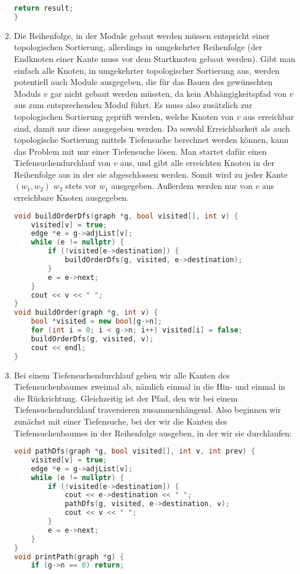 \documentclass[11pt,a4paper]{article}
\begin{document}
\begin{loesung}
\begin{enumerate}
\begin{lstlisting}[language=c++]
    return result;
}
        \end{lstlisting}

        \item
        Die Reihenfolge, in der Module gebaut werden müssen entspricht einer topologischen Sortierung, allerdings in umgekehrter Reihenfolge (der Endknoten einer Kante muss vor dem Startknoten gebaut werden).
        Gibt man einfach alle Knoten, in umgekehrter topologischer Sortierung aus, werden potentiell auch Module ausgegeben, die für das Bauen des gewünschten Moduls $v$ gar nicht gebaut werden müssten, da kein Abhängigkeitspfad von $v$ aus zum entsprechenden Modul führt.
        Es muss also zusätzlich zur topologischen Sortierung geprüft werden, welche Knoten von $v$ aus erreichbar sind, damit nur diese ausgegeben werden.
        Da sowohl Erreichbarkeit als auch topologische Sortierung mittels Tiefensuche berechnet werden können, kann das Problem mit nur einer Tiefensuche lösen.
        Man startet dafür einen Tiefensuchendurchlauf von $v$ aus, und gibt alle erreichten Knoten in der Reihenfolge aus in der sie abgeschlossen werden.
        Somit wird zu jeder Kante $(w_1, w_2)$ $w_2$ stets vor $w_1$ ausgegeben.
        Außerdem werden nur von $v$ aus erreichbare Knoten ausgegeben.
        \begin{lstlisting}[language=c++]
void buildOrderDfs(graph *g, bool visited[], int v) {
    visited[v] = true;
    edge *e = g->adjList[v];
    while (e != nullptr) {
        if (!visited[e->destination]) {
            buildOrderDfs(g, visited, e->destination);
        }
        e = e->next;
    }
    cout << v << " ";
}
void buildOrder(graph *g, int v) {
    bool *visited = new bool[g->n];
    for (int i = 0; i < g->n; i++) visited[i] = false;
    buildOrderDfs(g, visited, v);
    cout << endl;
}
        \end{lstlisting}

        \item
        Bei einem Tiefensuchendurchlauf gehen wir alle Kanten des Tiefensuchenbaumes zweimal ab, nämlich einmal in die Hin- und einmal in die Rückrichtung.
        Gleichzeitig ist der Pfad, den wir bei einem Tiefensuchendurchlauf traversieren zusammenhängend.
        Also beginnen wir zunächst mit einer Tiefensuche, bei der wir die Kanten des Tiefensuchenbaumes in der Reihenfolge ausgeben, in der wir sie durchlaufen:
        \begin{lstlisting}[language=c++]
void pathDfs(graph *g, bool visited[], int v, int prev) {
    visited[v] = true;
    edge *e = g->adjList[v];
    while (e != nullptr) {
        if (!visited[e->destination]) {
            cout << e->destination << " ";
            pathDfs(g, visited, e->destination, v);
            cout << v << " ";
        }
        e = e->next;
    }
}
void printPath(graph *g) {
    if (g->n == 0) return;


\end{lstlisting}
\end{enumerate}
\end{loesung}
\end{document}

